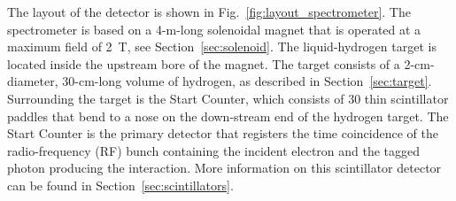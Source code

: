 The layout of the \gx{} detector is shown in Fig.~\ref{fig:layout_spectrometer}. The spectrometer is based on a 4-m-long solenoidal magnet that is operated at a maximum field of 2~T, see Section~\ref{sec:solenoid}. The liquid-hydrogen target is located inside the upstream bore of the magnet. The target consists of a 2-cm-diameter, 30-cm-long volume of hydrogen, as described in Section~\ref{sec:target}. Surrounding the target is the Start Counter, which consists of 30 thin scintillator paddles that bend to a nose on the down-stream end of the hydrogen target. The Start Counter is the primary detector that registers the time coincidence of the radio-frequency (RF) bunch containing the incident electron and the tagged photon producing the interaction. More information on this scintillator detector can be found in Section~\ref{sec:scintillators}. 


